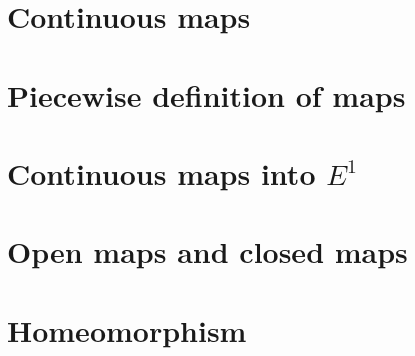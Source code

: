 \section{Continuous maps}

\section{Piecewise definition of maps}

\section{Continuous maps into \( E^{1} \)}

\section{Open maps and closed maps}

\section{Homeomorphism}
